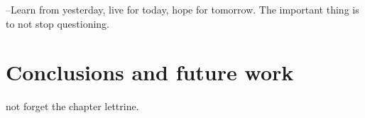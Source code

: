 \begin{savequote}[75mm] 
--Learn from yesterday, live for today, hope for tomorrow. The important thing is to not stop questioning.
\end{savequote}




\chapter{Conclusions and future work}
\label{ch:conclusions}

 not forget the chapter lettrine.\vspace{2cm}
